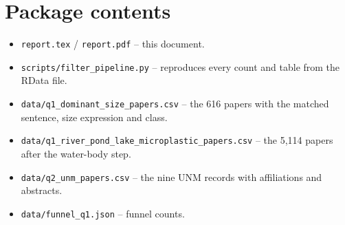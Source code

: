 \documentclass[11pt,a4paper]{article}
\begin{document}
\section{Package contents}
\begin{itemize}
\item \texttt{report.tex} / \texttt{report.pdf} -- this document.
\item \texttt{scripts/filter\_pipeline.py} -- reproduces every count and table from the RData file.
\item \texttt{data/q1\_dominant\_size\_papers.csv} -- the 616 papers with the matched sentence, size expression and class.
\item \texttt{data/q1\_river\_pond\_lake\_microplastic\_papers.csv} -- the 5,114 papers after the water-body step.
\item \texttt{data/q2\_unm\_papers.csv} -- the nine UNM records with affiliations and abstracts.
\item \texttt{data/funnel\_q1.json} -- funnel counts.
\end{itemize}
\end{document}
